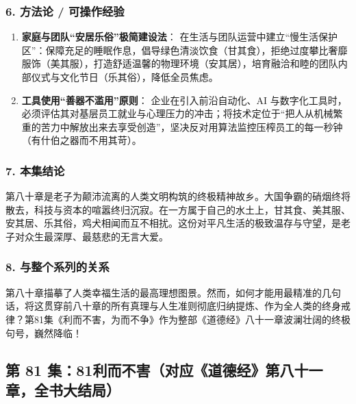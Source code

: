 \subsubsection{6. 方法论 / 可操作经验}
\begin{enumerate}
    \item \textbf{家庭与团队“安居乐俗”极简建设法}：
    在生活与团队运营中建立“慢生活保护区”：保障充足的睡眠作息，倡导绿色清淡饮食（甘其食），拒绝过度攀比奢靡服饰（美其服），打造舒适温馨的物理环境（安其居），培育融洽和睦的团队内部仪式与文化节日（乐其俗），降低全员焦虑。
    \item \textbf{工具使用“善器不滥用”原则}：
    企业在引入前沿自动化、AI 与数字化工具时，必须评估其对基层员工就业与心理压力的冲击；将技术定位于“把人从机械繁重的苦力中解放出来去享受创造”，坚决反对用算法监控压榨员工的每一秒钟（有什伯之器而不用其苛）。
\end{enumerate}

\subsubsection{7. 本集结论}
第八十章是老子为颠沛流离的人类文明构筑的终极精神故乡。大国争霸的硝烟终将散去，科技与资本的喧嚣终归沉寂。在一方属于自己的水土上，甘其食、美其服、安其居、乐其俗，鸡犬相闻而互不相扰。这份对平凡生活的极致温存与守望，是老子对众生最深厚、最慈悲的无言大爱。

\subsubsection{8. 与整个系列的关系}
第八十章描摹了人类幸福生活的最高理想图景。然而，如何才能用最精准的几句话，将这贯穿前八十章的所有真理与人生准则彻底归纳提炼、作为全人类的终身戒律？第81集《利而不害，为而不争》作为整部《道德经》八十一章波澜壮阔的终极句号，巍然降临！

\clearpage

\subsection{第 81 集：81利而不害（对应《道德经》第八十一章，全书大结局）}
\label{sec:ep81}


